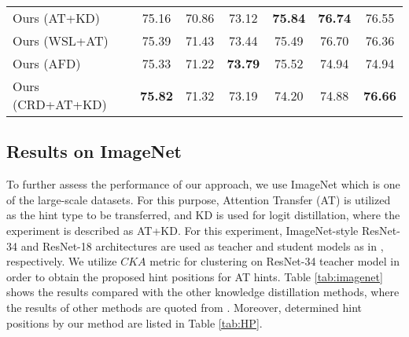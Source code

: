 \documentclass[final,3p,times]{elsarticle}
\begin{document}
\begin{table}[]
{\begin{tabular}{l|c|c|c|c|c|c}
\hline
Ours (AT+KD) & 75.16 & 70.86 & 73.12 & \textbf{75.84}  & \textbf{76.74} & {76.55} \\
Ours (WSL+AT) & 75.39 & 71.43 & 73.44  & 75.49 & 76.70 & 76.36 \\
Ours (AFD) & 75.33 & 71.22 & \textbf{73.79} & 75.52 & 74.94  & 74.94 \\  
Ours (CRD+AT+KD) & {\textbf{75.82}} & {71.32} & {73.19} & {74.20} & {74.88} & {\textbf{76.66}} \\
\hline
\end{tabular}}
\label{tab:CRD}
\end{table}




\subsection{Results on ImageNet}
To further assess the performance of our approach, we use ImageNet which is one of the large-scale datasets. For this purpose, Attention Transfer (AT) is utilized as the hint type to be transferred, and KD is used for logit distillation, where the experiment is described as AT+KD. For this experiment, ImageNet-style ResNet-34 and ResNet-18 architectures are used as teacher and student models as in \citep{tian2019contrastive}, respectively. We utilize $CKA$ metric for clustering on ResNet-34 teacher model in order to obtain the proposed hint positions {for AT hints}. Table \ref{tab:imagenet} shows the results compared with the other knowledge distillation methods, where the results of other methods are quoted from \citep{tian2019contrastive}. Moreover, determined hint positions by our method are listed in Table \ref{tab:HP}.
\end{document}
